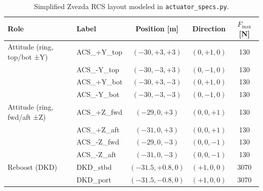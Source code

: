 \documentclass[conference]{IEEEtran}
\begin{document}
\begin{table}[h]
\centering
\caption{Simplified Zvezda RCS layout modeled in \texttt{actuator\_specs.py}.}
\label{tab:thrusters}
\small
\begin{tabular}{@{}llccc@{}}
\toprule
Role & Label & Position [m] & Direction & $F_{\max}$ [N] \\
\midrule
Attitude (ring, top/bot ±Y)    & ACS\_+Y\_top & $(-30,+3,+3)$ & $(0,+1,0)$ & 130 \\
                               & ACS\_-Y\_top & $(-30,-3,+3)$ & $(0,-1,0)$ & 130 \\
                               & ACS\_+Y\_bot & $(-30,+3,-3)$ & $(0,+1,0)$ & 130 \\
                               & ACS\_-Y\_bot & $(-30,-3,-3)$ & $(0,-1,0)$ & 130 \\
Attitude (ring, fwd/aft ±Z)    & ACS\_+Z\_fwd & $(-29,0,+3)$  & $(0,0,+1)$ & 130 \\
                               & ACS\_+Z\_aft & $(-31,0,+3)$  & $(0,0,+1)$ & 130 \\
                               & ACS\_-Z\_fwd & $(-29,0,-3)$  & $(0,0,-1)$ & 130 \\
                               & ACS\_-Z\_aft & $(-31,0,-3)$  & $(0,0,-1)$ & 130 \\
Reboost (DKD)                  & DKD\_stbd    & $(-31.5,+0.8,0)$ & $(+1,0,0)$ & 3070 \\
                               & DKD\_port    & $(-31.5,-0.8,0)$ & $(+1,0,0)$ & 3070 \\
\bottomrule
\end{tabular}
\end{table}
\end{document}
